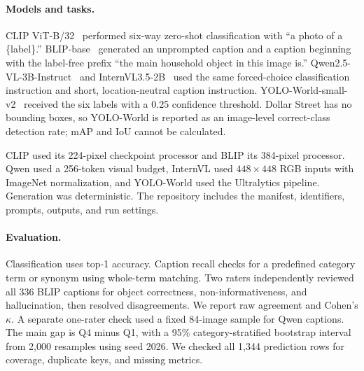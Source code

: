 \documentclass[10pt,twocolumn,letterpaper]{article}
\begin{document}
\paragraph{Models and tasks.} CLIP ViT-B/32~\cite{radford2021} performed six-way zero-shot classification with ``a photo of a \{label\}.'' BLIP-base~\cite{li2022} generated an unprompted caption and a caption beginning with the label-free prefix ``the main household object in this image is.'' Qwen2.5-VL-3B-Instruct~\cite{bai2025} and InternVL3.5-2B~\cite{wang2025} used the same forced-choice classification instruction and short, location-neutral caption instruction. YOLO-World-small-v2~\cite{cheng2024} received the six labels with a 0.25 confidence threshold. Dollar Street has no bounding boxes, so YOLO-World is reported as an image-level correct-class detection rate; mAP and IoU cannot be calculated.

CLIP used its 224-pixel checkpoint processor and BLIP its 384-pixel processor. Qwen used a 256-token visual budget, InternVL used $448\times448$ RGB inputs with ImageNet normalization, and YOLO-World used the Ultralytics pipeline. Generation was deterministic. The repository includes the manifest, identifiers, prompts, outputs, and run settings.

\paragraph{Evaluation.} Classification uses top-1 accuracy. Caption recall checks for a predefined category term or synonym using whole-term matching. Two raters independently reviewed all 336 BLIP captions for object correctness, non-informativeness, and hallucination, then resolved disagreements. We report raw agreement and Cohen's $\kappa$. A separate one-rater check used a fixed 84-image sample for Qwen captions. The main gap is Q4 minus Q1, with a 95\% category-stratified bootstrap interval from 2,000 resamples using seed 2026. We checked all 1,344 prediction rows for coverage, duplicate keys, and missing metrics.
\end{document}
